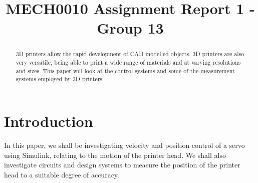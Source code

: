 \documentclass[conference]{IEEEtran}
\begin{document}
\title{MECH0010 Assignment Report 1 - Group 13
}

\author{
\and
{}
\and
{}
}

\maketitle
\begin{abstract}
    3D printers allow the rapid development of CAD modelled objects. 3D printers are also very versatile, being able to print a wide range of materials and at varying resolutions and sizes. This paper will look at the control systems and some of the measurement systems employed by 3D printers.
\end{abstract}

\section*{Introduction}
In this paper, we shall be investigating velocity and position control of a servo using Simulink, relating to the motion of the printer head. We shall also investigate circuits and design systems to measure the position of the printer head to a suitable degree of accuracy. 
\end{document}
